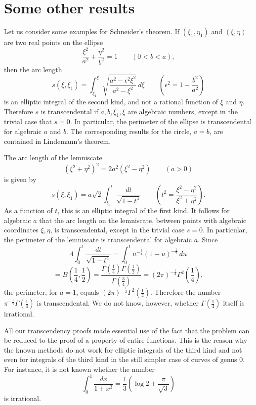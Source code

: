 \section{Some other results}\label{sec:4.5}

Let us consider some examples for Schneider's theorem. If $(\xi_1, \eta_1)$ and $(\xi, \eta)$ are two real points on the ellipse
\[
\frac{\xi^2}{a^2} + \frac{\eta^2}{b^2} = 1 \qquad (0 < b < a),
\]
then the arc length
\[
s(\xi, \xi_1) = \int_{\xi_1}^{\xi} \sqrt{\frac{a^2 - \epsilon^2 \xi^2}{a^2 - \xi^2}} \, d\xi \qquad \left(\epsilon^2 = 1 - \frac{b^2}{a^2}\right)
\]
is an elliptic integral of the second kind, and not a rational function of $\xi$ and $\eta$. Therefore $s$ is transcendental if $a, b, \xi_1, \xi$ are algebraic numbers, except in the trivial case that $s=0$. In particular, the perimeter of the ellipse is transcendental for algebraic $a$ and $b$. The corresponding results for the circle, $a=b$, are contained in Lindemann's theorem.

The arc length of the lemniscate
\[
(\xi^2 + \eta^2)^2 = 2a^2(\xi^2 - \eta^2) \qquad (a > 0)
\]
is given by
\[
s(\xi, \xi_1) = a\sqrt{2} \int_{t_1}^{t} \frac{dt}{\sqrt{1-t^4}} \qquad \left(t^2 = \frac{\xi^2 - \eta^2}{\xi^2 + \eta^2}\right).
\]
As a function of $t$, this is an elliptic integral of the first kind. It follows for algebraic $a$ that the arc length on the lemniscate, between points with algebraic coordinates $\xi, \eta$, is transcendental, except in the trivial case $s=0$. In particular, the perimeter of the lemniscate is transcendental for algebraic $a$. Since
\[
4 \int_{0}^{1} \frac{dt}{\sqrt{1-t^{4}}} = \int_{0}^{1} u^{-\frac{3}{4}} (1-u)^{-\frac{1}{2}} \, du
\]
\[
= B \left(\frac{1}{4}, \frac{1}{2}\right) = \frac{\Gamma \left(\frac{1}{4}\right) \Gamma \left(\frac{1}{2}\right)}{\Gamma \left(\frac{3}{4}\right)} = (2 \pi)^{-\frac{1}{2}} \Gamma^{2} \left(\frac{1}{4}\right),
\]
the perimeter, for $a=1$, equals $(2\pi)^{-\frac{1}{2}} \Gamma^2(\frac{1}{4})$. Therefore the number $\pi^{-\frac{1}{4}} \Gamma(\frac{1}{4})$ is transcendental. We do not know, however, whether $\Gamma(\frac{1}{4})$ itself is irrational.

All our transcendency proofs made essential use of the fact that the problem can be reduced to the proof of a property of entire functions. This is the reason why the known methods do not work for elliptic integrals of the third kind and not even for integrals of the third kind in the still simpler case of curves of genus 0. For instance, it is not known whether the number
\[
\int_0^1 \frac{dx}{1+x^3} = \frac{1}{3} \left(\log 2 + \frac{\pi}{\sqrt{3}}\right)
\]
is irrational.

